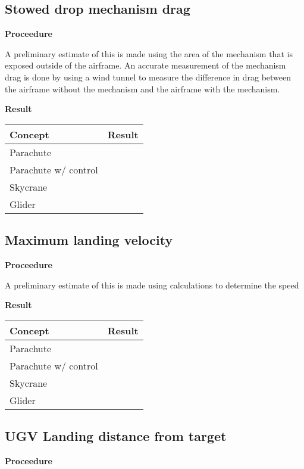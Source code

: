 \documentclass[]{auvsi_doc}
\begin{document}
	\subsection{Stowed drop mechanism drag}                                   
	\textbf{Proceedure}

	A preliminary estimate of this is made using the area of the mechanism that is exposed outside of the airframe. 
	An accurate measurement of the mechanism drag is done by using a wind tunnel to measure the difference in drag between the airframe without the mechanism and the airframe with the mechanism.
	
	\textbf{Result}
	
	\begin{tabular}{|l|l|}
		\hline
		\textbf{Concept}       & \textbf{Result} \\
		\hline
		Parachute              &                 \\
		Parachute w/ control   &                 \\
		Skycrane               &                 \\
		Glider                 &				 \\
		\hline
	\end{tabular}

	\subsection{Maximum landing velocity}
	\textbf{Proceedure}
	
	A preliminary estimate of this is made using calculations to determine the speed 

	\textbf{Result}

	\begin{tabular}{|l|l|}
		\hline
		\textbf{Concept}       & \textbf{Result} \\
		\hline
		Parachute              &                 \\
		Parachute w/ control   &                 \\
		Skycrane               &                 \\
		Glider                 &				 \\
		\hline
	\end{tabular}

	\subsection{UGV Landing distance from target}
	\textbf{Proceedure}
\end{document}
